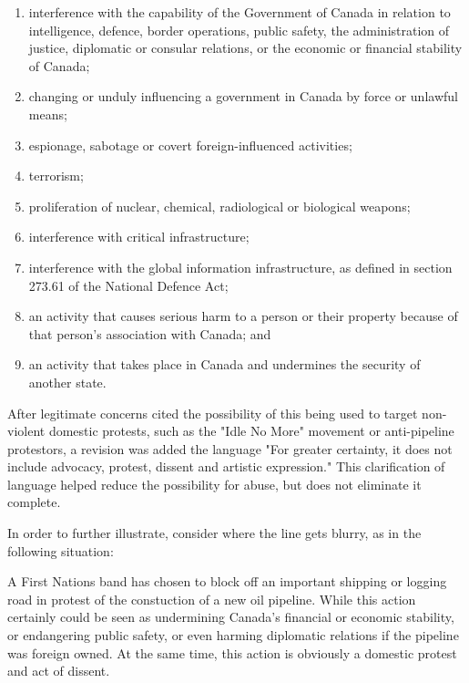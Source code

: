 \documentclass[a4paper, 11pt]{article} %
\begin{document}
\begin{enumerate}
    \item interference with the capability of the Government of Canada in relation to intelligence, defence, border operations, public safety, the administration of justice, diplomatic or consular relations, or the economic or financial stability of Canada;
    \item changing or unduly influencing a government in Canada by force or unlawful means;
    \item espionage, sabotage or covert foreign-influenced activities;
    \item terrorism;
    \item proliferation of nuclear, chemical, radiological or biological weapons;
    \item interference with critical infrastructure;
    \item interference with the global information infrastructure, as defined in section 273.61 of the National Defence Act;
    \item an activity that causes serious harm to a person or their property because of that person's association with Canada; and
    \item an activity that takes place in Canada and undermines the security of another state.
\end{enumerate}

After legitimate concerns cited the possibility of this being used to target non-violent domestic protests, such as the "Idle No More" movement or anti-pipeline protestors, a revision was added the language "For greater certainty, it does not include advocacy, protest, dissent and artistic expression." This clarification of language helped reduce the possibility for abuse, but does not eliminate it complete.

In order to further illustrate, consider where the line gets blurry, as in the following situation:

\begin{displayquote}
A First Nations band has chosen to block off an important shipping or logging road in protest of the constuction of a new oil pipeline. While this action certainly could be seen as undermining Canada's financial or economic stability, or endangering public safety, or even harming diplomatic relations if the pipeline was foreign owned. At the same time, this action is obviously a domestic protest and act of dissent.
\end{displayquote}
\end{document}
